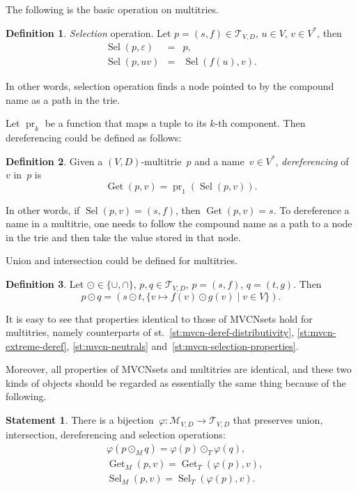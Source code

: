 \documentclass{article}
\theoremstyle{definition}
\newtheorem{Df}{Definition}
\newtheorem{St}{Statement}
\newcommand{\setcharmvcn}{M}
\newcommand{\setcharmt}{T}
\newcommand{\setsymbol}[3]{\mathcal{#1}_{#2,#3}}
\newcommand{\setmvcn}[2]{\setsymbol{\setcharmvcn}{#1}{#2}}
\newcommand{\setmt}[2]{\setsymbol{\setcharmt}{#1}{#2}}
\newcommand{\select}{\operatorname{Sel}}
\newcommand{\deref}{\operatorname{Get}}
\newcommand{\proj}[1]{\operatorname{pr}_{#1}}
\begin{document}
The following is the basic operation on multitries.
\begin{Df}\label{df:mt-select}
\emph{Selection} operation. Let $p=(s,f) \in \setmt{V}{D}$, $u\in V$,
$v\in V^\ast$, then
\begin{eqnarray*}
  \select(p, \varepsilon) & = & p , \\
  \select(p, u v) & = & \select(f(u), v) .
\end{eqnarray*}
\end{Df}

In other words, selection operation finds a node pointed to by the
compound name as a path in the trie.

Let $\proj{k}$ be a function that maps a tuple to its $k$-th component.
Then dereferencing could be defined as follows:
\begin{Df}\label{df:mt-deref}
Given a $(V,D)$-multitrie~$p$ and a name~$v\in V^\ast$, \emph{dereferencing}
of~$v$ in~$p$ is
\[
  \deref(p, v) = \proj{1}(\select(p, v)) .
\]
\end{Df}

In other words, if $\select(p,v) = (s,f)$, then $\deref(p, v) = s$. To
dereference a name in a multitrie, one needs to follow the compound name
as a path to a node in the trie and then take the value stored in that node.

Union and intersection could be defined for multitries.
\begin{Df}\label{df:mt-setop}
Let $\odot \in \{ \cup, \cap \}$, $p, q \in \setmt{V}{D}$,
$p = (s,f)$, $q = (t, g)$. Then
\[
  p \odot q = (s \odot t, \{ v \mapsto f(v) \odot g(v) \mid v \in V \}) .
\]
\end{Df}

It is easy to see that properties identical to those of MVCNsets
hold for multitries, namely counterparts of
st.~\ref{st:mvcn-deref-distributivity},
\ref{st:mvcn-extreme-deref},
\ref{st:mvcn-neutrals}
and~\ref{st:mvcn-selection-properties}.

Moreover, all properties of MVCNsets and multitries are identical, and these
two kinds of objects should be regarded as essentially the same thing because
of the following.

\begin{St}\label{st:isomorph}
There is a bijection~$\varphi: \setmvcn{V}{D} \to \setmt{V}{D}$ that preserves
union, intersection, dereferencing and selection operations:
\begin{eqnarray*}
  & \varphi(p \mathbin{\odot_{\setcharmvcn}} q) =
      \varphi(p) \mathbin{\odot_{\setcharmt}} \varphi(q) , \\
  & \deref_{\setcharmvcn}(p, v) =
      \deref_{\setcharmt}(\varphi(p), v) , \\
  & \select_{\setcharmvcn}(p, v) =
      \select_{\setcharmt}(\varphi(p), v) .
\end{eqnarray*}
\end{St}
\end{document}
